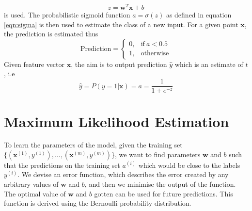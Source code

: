 \documentclass[12pt]{report}
\numberwithin{equation}{section}
\begin{document}
\begin{equation}\label{eqn:linear}
z = \bm{w}^T\bm{x} + b
\end{equation}
is used. The probabilistic sigmoid function $a=\sigma(z)$ as defined in equation \eqref{eqn:sigma} is then used to estimate the class of a new input. For a given point $\bm{x}$, the prediction is estimated thus
\begin{equation} \label{eq:inference}
\text{Prediction} = \left\{
	\begin{array}{ll}
	0, & \text{if}\  a < 0.5 \\
    1, & \text{otherwise}
	\end{array} \right.
\end{equation}
Given feature vector $\bm{x}$, the aim is to output prediction $\hat{y}$ which is an estimate of $t$, i.e 
\begin{equation}\label{eqn:t}
\hat{y} = P(y=1|\bm{x}) = a = \frac{1}{1+e^{-z}}
\end{equation}

\section{Maximum Likelihood Estimation}
To learn the parameters of the model, given the training set $\{(\bm{x}^{(1)},y^{(1)}),\hdots,(\bm{x}^{(m)},y^{(m)})\}$, we want to find parameters $\bm{w}$ and $b$ such that the predictions on the training set $a^{(i)}$ which would be close to the labels  $y^{(i)}$. We devise an error function, which describes the error created by any arbitrary values of $\bm{w}$ and $b$, and then we minimise the output of the function. The optimal value of $\bm{w}$ and $b$ gotten can be used for future predictions. This function is derived using the Bernoulli probability distribution. 
\end{document}
